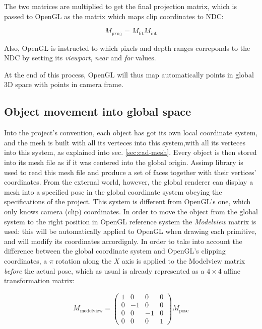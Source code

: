 The two matrices are multiplied to get the final projection matrix, which is
passed to OpenGL as the matrix which maps clip coordinates to NDC:

\begin{equation}
  M_{\texttt{proj}}=M_{\text{fit}}M_{\text{int}}
\end{equation}

Also, OpenGL is instructed to which pixels and depth ranges correponds to the
NDC by setting its \emph{viewport}, \emph{near} and \emph{far} values.

At the end of this process, OpenGL will thus map automatically points in global
3D space with points in camera frame.

\subsection{Object movement into global space}
Into the project's convention, each object has got its own local coordinate
system, and the mesh is built with all its verteces into this system,with all
its verteces into this system,  as explained into sec. \ref{sec:cad-mesh}. Every
object is then stored into its mesh file as if it was centered into the global
origin. Assimp library is used to read this mesh file and produce a set of faces
together with their vertices' coordinates. From the external world, however, the global
renderer can display a mesh into a specified pose in the global coordinate
system obeying the specifications of the project. This system is different from
OpenGL's one, which only knows camera (clip) coordinates. In order to move
the object from the global system to the right position in OpenGL reference
system the \emph{Modelview} matrix is used: this will be automatically applied
to OpenGL when drawing each primitive, and will modify its coordinates
accordignly. In order to take into account the difference between the global
coordinate system and OpenGL's clipping coordinates, a $\pi$ rotation along the
$X$ axis is applied
to the Modelview matrix \emph{before} the actual pose, which as usual is
already represented as a $4 \times 4$ affine transformation matrix:

\begin{equation} \label{eqn:modelview}
  M_{\text{modelview}} = 
  \begin{pmatrix}
    1 & 0 & 0 & 0 \\
    0 & -1 & 0 & 0 \\
    0 & 0 & -1 & 0 \\
    0 & 0 & 0 & 1 
  \end{pmatrix} M_{\text{pose}}
\end{equation}

